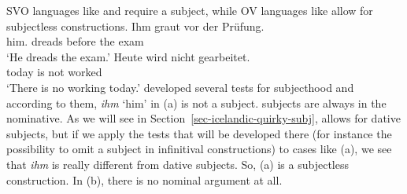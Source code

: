 SVO languages like  and  require a subject, while OV languages like  allow for
subjectless constructions.
\eal
\ex 
\gll Ihm graut vor der Prüfung.\\
     him.\DAT{} dreads before the exam\\\german
\glt `He dreads the exam.'
\ex 
\gll Heute wird nicht gearbeitet.\\
     today is   not worked\\
\glt `There is no working today.'
\zl
\citet{Reis82} developed several tests for subjecthood and according to them, \emph{ihm} `him' in
(a) is not a subject.  subjects are always in the nominative. As we will see in Section~\ref{sec-icelandic-quirky-subj},
 allows for dative subjects, but if we apply the tests that will be developed there (for instance the possibility to
omit a subject in infinitival constructions) to cases like (a), we see that \emph{ihm} is
really different from  dative subjects. So, (a) is a subjectless construction.
In (b), there is no nominal argument at all. 

